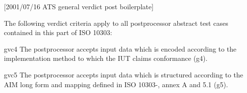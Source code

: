 [2001/07/16 ATS general verdict post boilerplate]

    The following verdict criteria apply to all postprocessor
abstract test cases contained in this part of ISO 10303:

gvc4 The postprocessor accepts input data which is encoded according
     to the implementation method to which the IUT claims conformance (g4).

gvc5 The postprocessor accepts input data which is structured according
     to the AIM \Express{} long form and mapping \maptableorspec{}
     defined in ISO 10303-\theAPpartno, annex A and 5.1 (g5).
\par

\endinput
